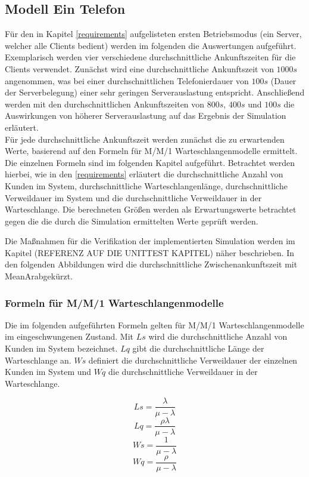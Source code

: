 \subsection{Modell \glqq Ein Telefon\grqq} 
Für den in Kapitel \ref{requirements} aufgelisteten ersten Betriebsmodus (ein Server, welcher alle Clients bedient) werden im folgenden die Auswertungen aufgeführt. Exemplarisch werden vier verschiedene durchschnittliche Ankunftszeiten für die Clients verwendet. Zunächst wird eine durchschnittliche Ankunftszeit von $1000s$ angenommen, was bei einer durchschnittlichen Telefonierdauer von $100s$ (Dauer der Serverbelegung) einer sehr geringen Serverauslastung entspricht. Anschließend werden mit den durchschnittlichen Ankunftszeiten von $800s$, $400s$ und $100s$ die Auswirkungen von höherer Serverauslastung auf das Ergebnis der Simulation erläutert. \\

Für jede durchschnittliche Ankunftszeit werden zunächst die zu erwartenden Werte, basierend auf den Formeln für M/M/1 Warteschlangenmodelle ermittelt. Die einzelnen Formeln sind im folgenden Kapitel aufgeführt. Betrachtet werden hierbei, wie in den \ref{requirements} erläutert die durchschnittliche Anzahl von Kunden im System, durchschnittliche Warteschlangenlänge, durchschnittliche Verweildauer im System und die durchschnittliche Verweildauer in der Warteschlange. Die berechneten Größen werden als Erwartungswerte betrachtet gegen die die durch die Simulation ermittelten Werte geprüft werden. 

Die Maßnahmen für die Verifikation der implementierten Simulation werden im Kapitel (REFERENZ AUF DIE UNITTEST KAPITEL) näher beschrieben. In den folgenden Abbildungen wird die durchschnittliche Zwischenankunftszeit mit \glqq MeanAr\grqq abgekürzt.

\subsubsection{Formeln für M/M/1 Warteschlangenmodelle}
\label{Formeln}
Die im folgenden aufgeführten Formeln gelten für M/M/1 Warteschlangenmodelle im eingeschwungenen Zustand. Mit $Ls$ wird die durchschnittliche Anzahl von Kunden im System bezeichnet. $Lq$ gibt die durchschnittliche Länge der Warteschlange an. $Ws$ definiert die durchschnittliche Verweildauer der einzelnen Kunden im System und $Wq$ die durchschnittliche Verweildauer in der Warteschlange. 

\begin{equation}
Ls=\frac{\lambda}{\mu - \lambda}
\end{equation}
\begin{equation}
Lq=\frac{\rho\lambda}{\mu - \lambda}
\end{equation}
\begin{equation}
Ws=\frac{1}{\mu - \lambda}
\end{equation}
\begin{equation}
Wq=\frac{\rho}{\mu - \lambda}
\end{equation}

